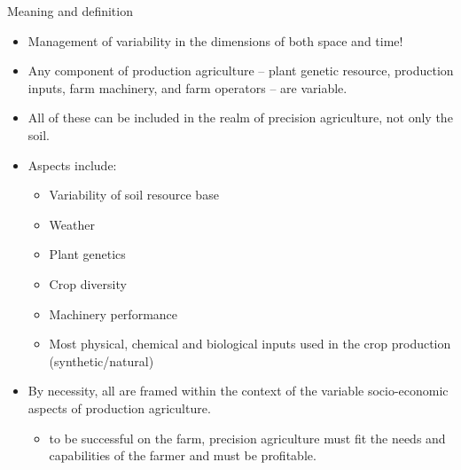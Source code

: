 \documentclass[11pt,dvipsnames,ignorenonframetext,aspectratio=169]{beamer}
\providecommand{\tightlist}{%
  \setlength{\itemsep}{0pt}\setlength{\parskip}{0pt}}
\begin{document}
\begin{frame}{Meaning and definition}
\protect\hypertarget{meaning-and-definition}{}
\begin{itemize}
\tightlist
\item
  Management of \alert{variability} in the dimensions of both space and
  time!
\item
  Any component of production agriculture -- plant genetic resource,
  production inputs, farm machinery, and farm operators -- are variable.
\item
  All of these can be included in the realm of precision agriculture,
  not only the soil.
\item
  Aspects include:

  \begin{itemize}
  \tightlist
  \item
    Variability of soil resource base
  \item
    Weather
  \item
    Plant genetics
  \item
    Crop diversity
  \item
    Machinery performance
  \item
    Most physical, chemical and biological inputs used in the crop
    production (synthetic/natural)
  \end{itemize}
\item
  By necessity, all are framed within the context of the variable
  socio-economic aspects of production agriculture.

  \begin{itemize}
  \tightlist
  \item
    to be successful on the farm, precision agriculture must fit the
    needs and capabilities of the farmer and must be profitable.
  \end{itemize}
\end{itemize}
\end{frame}
\end{document}
